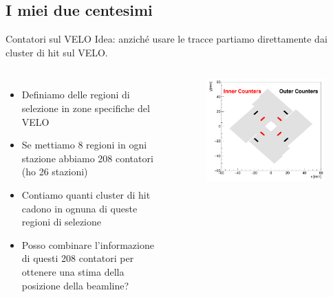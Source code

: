 \documentclass[
10pt,
aspectratio=169,
]{beamer}
\begin{document}
\subsection{I miei due centesimi}
\begin{frame}{Contatori sul VELO}
    Idea: anziché usare le tracce partiamo direttamente dai cluster di hit sul VELO.
    \begin{columns}
        \begin{itemize}
            \item Definiamo delle regioni di selezione in zone specifiche del VELO
            \item Se mettiamo 8 regioni in ogni stazione abbiamo 208 contatori (ho 26 stazioni)
            \item Contiamo quanti cluster di hit cadono in ognuna di queste regioni di selezione
            \item Posso combinare l'informazione di questi 208 contatori per ottenere una stima della posizione della beamline?
        \end{itemize}

        \begin{figure}
            \centering
            \includegraphics[width=\textwidth]{counters.png}
        \end{figure}
    \end{columns}
\end{frame}
\end{document}
